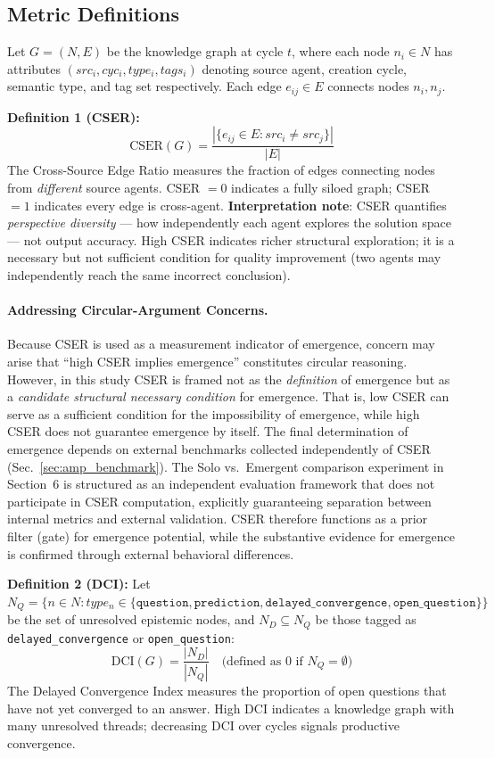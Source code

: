 \documentclass[12pt]{article}
\begin{document}
\subsection{Metric Definitions}

Let $G = (N, E)$ be the knowledge graph at cycle $t$, where each node $n_i \in N$ has
attributes $(src_i, cyc_i, type_i, tags_i)$ denoting source agent, creation cycle,
semantic type, and tag set respectively. Each edge $e_{ij} \in E$ connects nodes $n_i, n_j$.

\textbf{Definition 1 (CSER):}
\[
  \text{CSER}(G) = \frac{|\{e_{ij} \in E : src_i \neq src_j\}|}{|E|}
\]
The Cross-Source Edge Ratio measures the fraction of edges connecting nodes from
\emph{different} source agents. CSER $= 0$ indicates a fully siloed graph; CSER $= 1$
indicates every edge is cross-agent.
\textbf{Interpretation note}: CSER quantifies \emph{perspective diversity} ---
how independently each agent explores the solution space --- not output accuracy.
High CSER indicates richer structural exploration; it is a necessary but not
sufficient condition for quality improvement (two agents may independently reach
the same incorrect conclusion).

\paragraph{Addressing Circular-Argument Concerns.}
Because CSER is used as a measurement indicator of emergence, concern may arise that ``high CSER implies emergence'' constitutes circular reasoning. However, in this study CSER is framed not as the \emph{definition} of emergence but as a \emph{candidate structural necessary condition} for emergence. That is, low CSER can serve as a sufficient condition for the impossibility of emergence, while high CSER does not guarantee emergence by itself. The final determination of emergence depends on external benchmarks collected independently of CSER (Sec.~\ref{sec:amp_benchmark}). The Solo vs.\ Emergent comparison experiment in Section~6 is structured as an independent evaluation framework that does not participate in CSER computation, explicitly guaranteeing separation between internal metrics and external validation. CSER therefore functions as a prior filter (gate) for emergence potential, while the substantive evidence for emergence is confirmed through external behavioral differences.

\textbf{Definition 2 (DCI):}
Let $N_Q = \{n \in N : type_n \in \{\texttt{question}, \texttt{prediction},
\texttt{delayed\_convergence}, \texttt{open\_question}\}\}$ be the set of
unresolved epistemic nodes, and $N_D \subseteq N_Q$ be those tagged as
\texttt{delayed\_convergence} or \texttt{open\_question}:
\[
  \text{DCI}(G) = \frac{|N_D|}{|N_Q|} \quad \text{(defined as 0 if } N_Q = \emptyset\text{)}
\]
The Delayed Convergence Index measures the proportion of open questions that have
not yet converged to an answer. High DCI indicates a knowledge graph with many
unresolved threads; decreasing DCI over cycles signals productive convergence.
\end{document}
